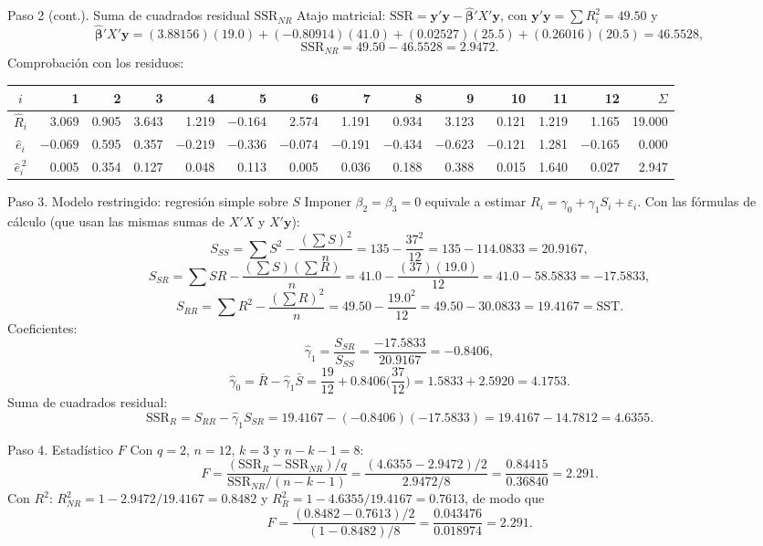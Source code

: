 \documentclass[11pt,letterpaper]{article}
\newcommand{\SSR}{\mathrm{SSR}}
\newcommand{\SST}{\mathrm{SST}}
\begin{document}
\begin{paso}{Paso 2 (cont.). Suma de cuadrados residual $\SSR_{NR}$}
Atajo matricial: $\SSR=\mathbf y'\mathbf y-\hat{\boldsymbol\beta}'X'\mathbf y$, con
$\mathbf y'\mathbf y=\sum R_i^2=49.50$ y
\[
\hat{\boldsymbol\beta}'X'\mathbf y=(3.88156)(19.0)+(-0.80914)(41.0)+(0.02527)(25.5)+(0.26016)(20.5)=46.5528,
\]
\[
\SSR_{NR}=49.50-46.5528=2.9472 .
\]
Comprobación con los residuos:
\begin{center}
\small
\footnotesize\setlength{\tabcolsep}{2pt}
\begin{tabular}{c*{12}{r}|r}
\toprule
$i$ & 1 & 2 & 3 & 4 & 5 & 6 & 7 & 8 & 9 & 10 & 11 & 12 & $\Sigma$\\
\midrule
$\hat R_i$ & 3.069 & 0.905 & 3.643 & 1.219 & $-0.164$ & 2.574 & 1.191 & 0.934 & 3.123 & 0.121 & 1.219 & 1.165 & 19.000\\
$\hat e_i$ & $-0.069$ & 0.595 & 0.357 & $-0.219$ & $-0.336$ & $-0.074$ & $-0.191$ & $-0.434$ & $-0.623$ & $-0.121$ & 1.281 & $-0.165$ & 0.000\\
$\hat e_i^{\,2}$ & 0.005 & 0.354 & 0.127 & 0.048 & 0.113 & 0.005 & 0.036 & 0.188 & 0.388 & 0.015 & 1.640 & 0.027 & 2.947\\
\bottomrule
\end{tabular}
\end{center}
\end{paso}

\begin{paso}{Paso 3. Modelo restringido: regresión simple sobre $S$}
Imponer $\beta_2=\beta_3=0$ equivale a estimar $R_i=\gamma_0+\gamma_1S_i+\varepsilon_i$. Con las
fórmulas de cálculo (que usan las mismas sumas de $X'X$ y $X'\mathbf y$):
\[
S_{SS}=\sum S^2-\frac{(\sum S)^2}{n}=135-\frac{37^2}{12}=135-114.0833=20.9167,
\]
\[
S_{SR}=\sum SR-\frac{(\sum S)(\sum R)}{n}=41.0-\frac{(37)(19.0)}{12}=41.0-58.5833=-17.5833,
\]
\[
S_{RR}=\sum R^2-\frac{(\sum R)^2}{n}=49.50-\frac{19.0^2}{12}=49.50-30.0833=19.4167=\SST .
\]
Coeficientes:
\[
\hat\gamma_1=\frac{S_{SR}}{S_{SS}}=\frac{-17.5833}{20.9167}=-0.8406,
\]
\[
\hat\gamma_0=\bar R-\hat\gamma_1\bar S=\frac{19}{12}+0.8406\Big(\frac{37}{12}\Big)=1.5833+2.5920=4.1753 .
\]
Suma de cuadrados residual:
\[
\SSR_R=S_{RR}-\hat\gamma_1S_{SR}=19.4167-(-0.8406)(-17.5833)=19.4167-14.7812=4.6355 .
\]
\end{paso}

\begin{paso}{Paso 4. Estadístico $F$}
Con $q=2$, $n=12$, $k=3$ y $n-k-1=8$:
\[
F=\frac{(\SSR_R-\SSR_{NR})/q}{\SSR_{NR}/(n-k-1)}
=\frac{(4.6355-2.9472)/2}{2.9472/8}
=\frac{0.84415}{0.36840}=2.291 .
\]
Con $R^2$: $R^2_{NR}=1-2.9472/19.4167=0.8482$ y $R^2_R=1-4.6355/19.4167=0.7613$, de modo que
\[
F=\frac{(0.8482-0.7613)/2}{(1-0.8482)/8}=\frac{0.043476}{0.018974}=2.291 .
\]
\end{paso}
\end{document}
